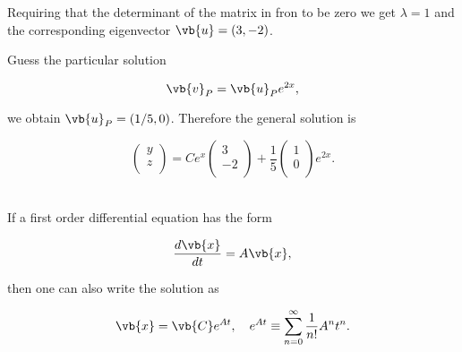 \documentclass[english,a4paper,12pt]{report}
\begin{document}
{Requiring that the determinant of the matrix in fron to be zero we get \(\lambda =1\) and the corresponding eigenvector \(\vb{u} = (3,-2)\). 

Guess the particular solution 

\begin{equation}
    \vb{v} _{P} = \vb{u} _{P} e^{2x}, 
\end{equation}

we obtain \(\vb{u} _{P} = (1/5,0) \). Therefore the general solution is 

\begin{equation}
    \begin{pmatrix}
         y \\
         z \\
    \end{pmatrix}= Ce^{x} \begin{pmatrix}
         3 \\
         -2 \\
    \end{pmatrix} + \frac{1}{5} \begin{pmatrix}
         1 \\
         0 \\
    \end{pmatrix} e^{2x}.  
\end{equation}
~
} 

If a first order differential equation has the form

\begin{equation}
    \frac{d\vb{x} }{dt} = A\vb{x} , 
\end{equation}

then one can also write the solution as 

\begin{equation}
    \vb{x} = \vb{C} e^{At}, \quad e^{At} \equiv \sum_{n=0}^{\infty} \frac{1}{n!}A^{n}t^{n}.       
\end{equation}
\end{document}
